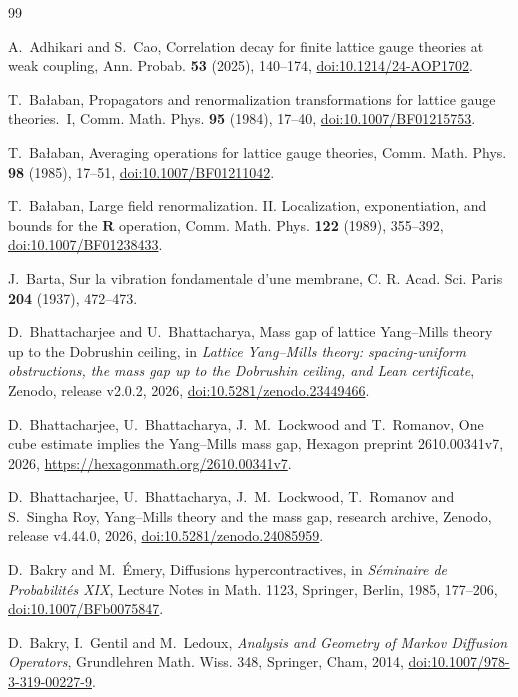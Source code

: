 \begin{thebibliography}{99}

A.~Adhikari and S.~Cao, Correlation decay for finite lattice gauge theories at weak coupling, Ann. Probab. \textbf{53} (2025), 140--174, \href{https://doi.org/10.1214/24-AOP1702}{doi:10.1214/24-AOP1702}.

T.~Ba{\l}aban, Propagators and renormalization transformations for lattice
gauge theories.~I, Comm. Math. Phys. \textbf{95} (1984), 17--40,
\href{https://doi.org/10.1007/BF01215753}{doi:10.1007/BF01215753}.

T.~Ba{\l}aban, Averaging operations for lattice gauge theories, Comm. Math.
Phys. \textbf{98} (1985), 17--51,
\href{https://doi.org/10.1007/BF01211042}{doi:10.1007/BF01211042}.

T.~Ba{\l}aban, Large field renormalization. II. Localization,
exponentiation, and bounds for the $\mathbf R$ operation, Comm. Math. Phys.
\textbf{122} (1989), 355--392,
\href{https://doi.org/10.1007/BF01238433}{doi:10.1007/BF01238433}.

J.~Barta, Sur la vibration fondamentale d'une membrane, C. R. Acad. Sci. Paris \textbf{204} (1937), 472--473.

D.~Bhattacharjee and U.~Bhattacharya, Mass gap of lattice Yang--Mills theory
up to the Dobrushin ceiling, in \emph{Lattice Yang--Mills theory: spacing-uniform
obstructions, the mass gap up to the Dobrushin ceiling, and Lean certificate},
Zenodo, release v2.0.2, 2026,
\href{https://doi.org/10.5281/zenodo.23449466}{doi:10.5281/zenodo.23449466}.

D.~Bhattacharjee, U.~Bhattacharya, J.~M.~Lockwood and T.~Romanov, One cube
estimate implies the Yang--Mills mass gap, Hexagon preprint 2610.00341v7,
2026, \url{https://hexagonmath.org/2610.00341v7}.

D.~Bhattacharjee, U.~Bhattacharya, J.~M.~Lockwood, T.~Romanov and S.~Singha
Roy, Yang--Mills theory and the mass gap, research archive, Zenodo, release
v4.44.0, 2026,
\href{https://doi.org/10.5281/zenodo.24085959}{doi:10.5281/zenodo.24085959}.

D.~Bakry and M.~\'Emery, Diffusions hypercontractives, in \emph{S\'eminaire
de Probabilit\'es XIX}, Lecture Notes in Math. 1123, Springer, Berlin, 1985,
177--206, \href{https://doi.org/10.1007/BFb0075847}{doi:10.1007/BFb0075847}.

D.~Bakry, I.~Gentil and M.~Ledoux, \emph{Analysis and Geometry of Markov
Diffusion Operators}, Grundlehren Math. Wiss. 348, Springer, Cham, 2014,
\href{https://doi.org/10.1007/978-3-319-00227-9}{doi:10.1007/978-3-319-00227-9}.


\end{thebibliography}
